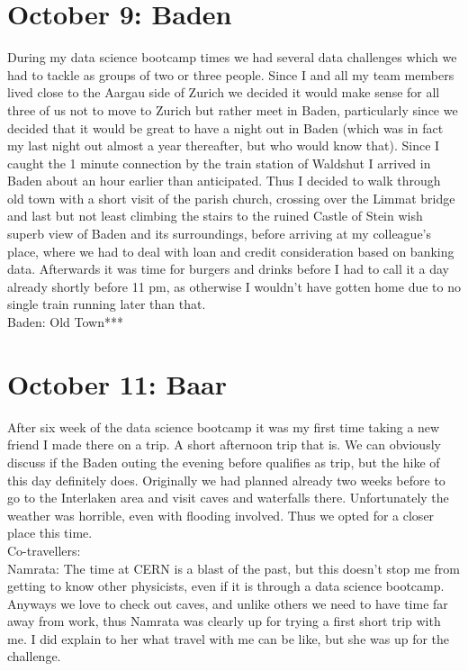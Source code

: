 \section{October 9: Baden}
\label{2020:Baden}

During my data science bootcamp times we had several data challenges which we had to tackle as groups of two or three people. Since I and all my team members lived close to the Aargau side of Zurich we decided it would make sense for all three of us not to move to Zurich but rather meet in Baden, particularly since we decided that it would be great to have a night out in Baden (which was in fact my last night out almost a year thereafter, but who would know that). Since I caught the 1 minute connection by the train station of Waldshut I arrived in Baden about an hour earlier than anticipated. Thus I decided to walk through old town with a short visit of the parish church, crossing over the Limmat bridge and last but not least climbing the stairs to the ruined Castle of Stein wish superb view of Baden and its surroundings, before arriving at my colleague's place, where we had to deal with loan and credit consideration based on banking data. Afterwards it was time for burgers and drinks before I had to call it a day already shortly before 11 pm, as otherwise I wouldn't have gotten home due to no single train running later than that.\\

Baden: Old Town***

\section{October 11: Baar}
\label{2020Baar}

After six week of the data science bootcamp it was my first time taking a new friend I made there on a trip. A short afternoon trip that is. We can obviously discuss if the Baden outing the evening before qualifies as trip, but the hike of this day definitely does. Originally we had planned already two weeks before to go to the Interlaken area and visit caves and waterfalls there. Unfortunately the weather was horrible, even with flooding involved. Thus we opted for a closer place this time.\\

Co-travellers:\\
Namrata: The time at CERN is a blast of the past, but this doesn't stop me from getting to know other physicists, even if it is through a data science bootcamp. Anyways we love to check out caves, and unlike others we need to have time far away from work, thus Namrata was clearly up for trying a first short trip with me. I did explain to her what travel with me can be like, but she was up for the challenge.\\


